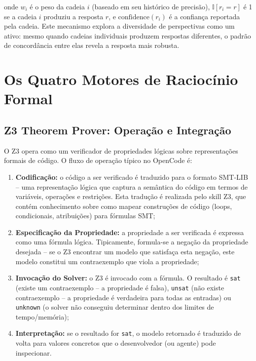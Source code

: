 \documentclass[12pt,a4paper,sumario=tradicional,openany]{abntex2}
\begin{document}
onde $w_i$ é o peso da cadeia $i$ (baseado em seu histórico de precisão), $\mathbb{I}[r_i = r]$ é 1 se a cadeia $i$ produziu a resposta $r$, e $\text{confidence}(r_i)$ é a confiança reportada pela cadeia. Este mecanismo explora a diversidade de perspectivas como um ativo: mesmo quando cadeias individuais produzem respostas diferentes, o padrão de concordância entre elas revela a resposta mais robusta.

\section{Os Quatro Motores de Raciocínio Formal}

\subsection{Z3 Theorem Prover: Operação e Integração}

O Z3 opera como um verificador de propriedades lógicas sobre representações formais de código. O fluxo de operação típico no OpenCode é:

\begin{enumerate}[leftmargin=*]
    \item \textbf{Codificação:} o código a ser verificado é traduzido para o formato SMT-LIB -- uma representação lógica que captura a semântica do código em termos de variáveis, operações e restrições. Esta tradução é realizada pelo skill Z3, que contém conhecimento sobre como mapear construções de código (loops, condicionais, atribuições) para fórmulas SMT;
    \item \textbf{Especificação da Propriedade:} a propriedade a ser verificada é expressa como uma fórmula lógica. Tipicamente, formula-se a negação da propriedade desejada -- se o Z3 encontrar um modelo que satisfaça esta negação, este modelo constitui um contraexemplo que viola a propriedade;
    \item \textbf{Invocação do Solver:} o Z3 é invocado com a fórmula. O resultado é \texttt{sat} (existe um contraexemplo -- a propriedade é falsa), \texttt{unsat} (não existe contraexemplo -- a propriedade é verdadeira para todas as entradas) ou \texttt{unknown} (o solver não conseguiu determinar dentro dos limites de tempo/memória);
    \item \textbf{Interpretação:} se o resultado for \texttt{sat}, o modelo retornado é traduzido de volta para valores concretos que o desenvolvedor (ou agente) pode inspecionar.
\end{enumerate}
\end{document}
